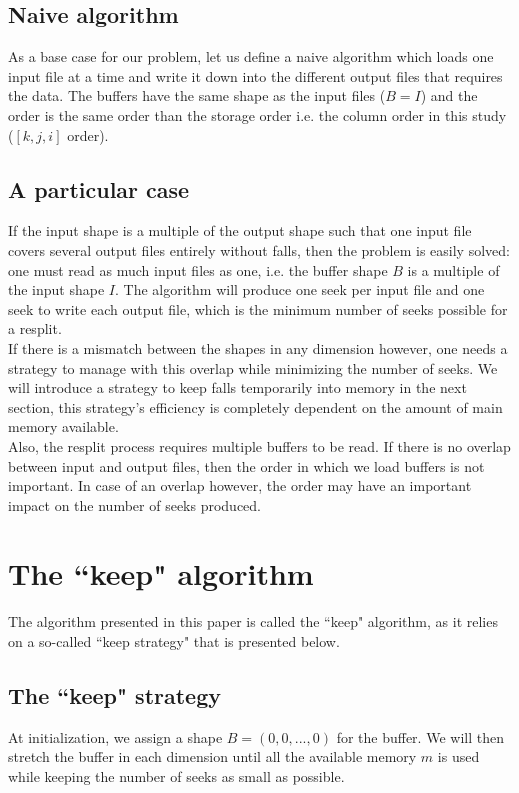 \documentclass[conference]{IEEEtran}
\begin{document}
\subsection{Naive algorithm}

As a base case for our problem, let us define a naive algorithm which loads one input file at a time and write it down into the different output files that requires the data.
The buffers have the same shape as the input files ($B=I$) and the order is the same order than the storage order i.e. the column order in this study ($[k, j, i]$ order).

\subsection{A particular case}

If the input shape is a multiple of the output shape such that one input file covers several output files entirely without falls, then the problem is easily solved: one must read as much input files as one, i.e. the buffer shape $B$ is a multiple of the input shape $I$.
The algorithm will produce one seek per input file and one seek to write each output file, which is the minimum number of seeks possible for a resplit.\\

If there is a mismatch between the shapes in any dimension however, one needs a strategy to manage with this overlap while minimizing the number of seeks.
We will introduce a strategy to keep falls temporarily into memory in the next section, this strategy's efficiency is completely dependent on the amount of main memory available. \\

Also, the resplit process requires multiple buffers to be read.
If there is no overlap between input and output files, then the order in which we load buffers is not important.
In case of an overlap however, the order may have an important impact on the number of seeks produced.

\section*{The ``keep" algorithm}
The algorithm presented in this paper is called the ``keep" algorithm, as it relies on a so-called ``keep strategy" that is presented below.

\subsection{The ``keep" strategy}
At initialization, we assign a shape $B = (0, 0,..., 0)$ for the buffer.
We will then stretch the buffer in each dimension until all the available memory $m$ is used while keeping the number of seeks as small as possible. \\
\end{document}
